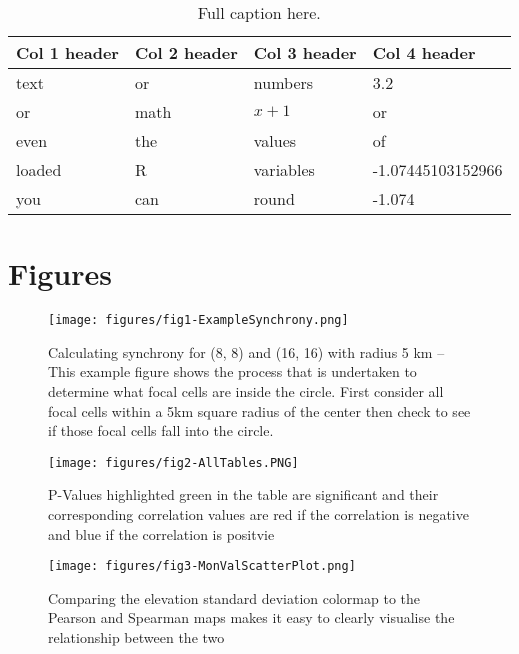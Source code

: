 \documentclass[letterpaper,11pt]{article}
\begin{document}
\begin{table}[H]
\caption[Summary caption, for table of contents, can be skipped.]{Full caption here.}
\begin{tabular}{llll} %
\hline 
Col 1 header & Col 2 header & Col 3 header & Col 4 header \\
\hline
text & or & numbers & 3.2 \\
or & math & $x+1$ & or \\
even & the & values & of \\
loaded & R & variables & -1.07445103152966 \\
you & can & round & -1.074 \\ 
\hline
\end{tabular}
\label{tab:random_table}
\end{table}

\clearpage
\newpage


\section{Figures}
\begin{figure}[!h]
\texttt{[image: figures/fig1-ExampleSynchrony.png]}
\caption{Calculating synchrony for (8, 8) and (16, 16) with radius 5 km – This example figure shows the process that is undertaken to determine what focal cells are inside the circle. First consider all focal cells within a 5km square radius of the center then check to see if those focal cells fall into the circle.} \label{fig:fig1}
\end{figure}

\begin{figure}[!h]
\texttt{[image: figures/fig2-AllTables.PNG]}
\caption{P-Values highlighted green in the table are significant and their corresponding correlation values are red if the correlation is negative and blue if the correlation is positvie} \label{fig:fig2}
\end{figure}

\begin{figure}[!h]
\texttt{[image: figures/fig3-MonValScatterPlot.png]}
\caption{Comparing the elevation standard deviation colormap to the Pearson and Spearman maps makes it easy to clearly visualise the relationship between the two} \label{fig:fig3}
\end{figure}
\end{document}
